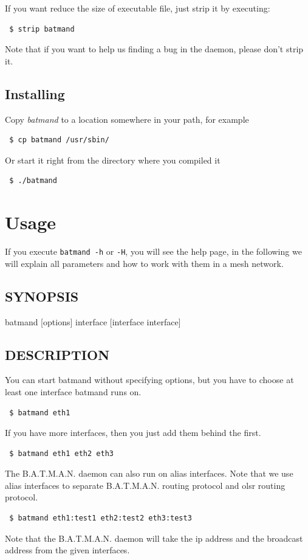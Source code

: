 \documentclass[
	12pt,
	a4paper,
	twoside,
	english,
	headsepline,
	footnosepline,
	automark,
	normalheadings,
	openany,
	cleardoubleplain,
	abstracton,
	idxtotoc,
	liststotoc,
	bibtotoc,
 	BCOR8mm,
]{scrartcl}
\begin{document}
If you want reduce the size of executable file, just strip it by executing: 

\begin{verbatim}
 $ strip batmand
\end{verbatim}

Note that if you want to help us finding a bug in the daemon, please don't strip it.

\subsection{Installing}
Copy \emph{batmand} to a location somewhere in your path, for example
\begin{verbatim}
 $ cp batmand /usr/sbin/
\end{verbatim}
Or start it right from the directory where you compiled it
\begin{verbatim}
 $ ./batmand
\end{verbatim}


\section{Usage}
If you execute \verb+batmand -h+ or \verb+-H+, you will see the help page, in the following we will explain all parameters and how to work with them in a mesh network.

\subsection{SYNOPSIS}
\begin{verb}
batmand [options] interface [interface interface]
\end{verb}


\subsection{DESCRIPTION}
You can start batmand without specifying options, but you have to choose at least one interface batmand runs on.
\begin{verbatim}
 $ batmand eth1
\end{verbatim}
If you have more interfaces, then you just add them behind the first.
\begin{verbatim}
 $ batmand eth1 eth2 eth3
\end{verbatim}
The B.A.T.M.A.N. daemon can also run on alias interfaces. Note that we use alias interfaces to separate B.A.T.M.A.N. routing protocol and olsr routing protocol.
\begin{verbatim}
 $ batmand eth1:test1 eth2:test2 eth3:test3
\end{verbatim}
Note that the B.A.T.M.A.N. daemon will take the ip address and the broadcast address from the given interfaces.
\end{document}
